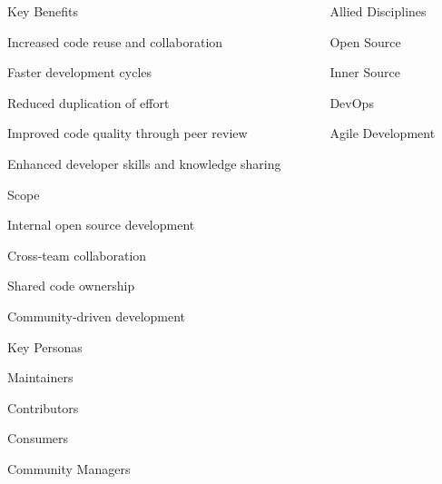 \documentclass{beamer}
\begin{document}
\begin{frame}[t]
    \begin{columns}[t]
        \begin{column}{0.32\textwidth}
            \begin{innersourcesection}{\keybenefitsicon}{Key Benefits}
                \item Increased code reuse and collaboration
                \item Faster development cycles
                \item Reduced duplication of effort
                \item Improved code quality through peer review
                \item Enhanced developer skills and knowledge sharing
            \end{innersourcesection}
            
            \begin{innersourcesection}{\scopeicon}{Scope}
                \item Internal open source development
                \item Cross-team collaboration
                \item Shared code ownership
                \item Community-driven development
            \end{innersourcesection}
            
            \begin{innersourcesection}{\personasicon}{Key Personas}
                \item Maintainers
                \item Contributors
                \item Consumers
                \item Community Managers
            \end{innersourcesection}
        \end{column}
        
        \begin{column}{0.32\textwidth}
            \begin{innersourcesection}{\alliedicon}{Allied Disciplines}
                \item Open Source
                \item Inner Source
                \item DevOps
                \item Agile Development
            \end{innersourcesection}
            

\end{column}
\end{columns}
\end{frame}
\end{document}
